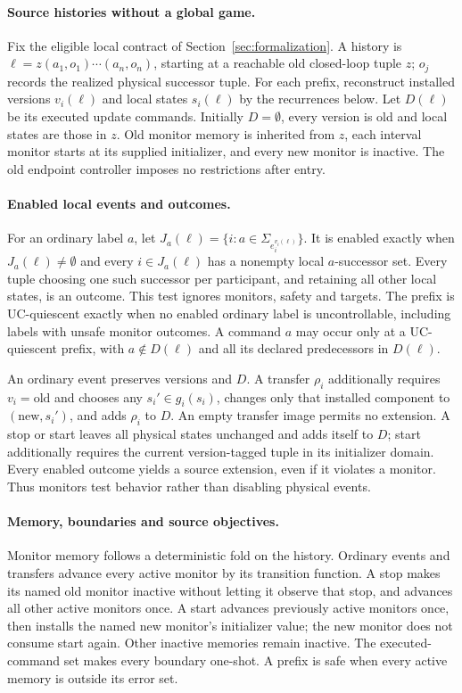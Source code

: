 \paragraph{Source histories without a global game.}
Fix the eligible local contract of Section~\ref{sec:formalization}. A history is
\(\ell=z(a_1,o_1)\cdots(a_n,o_n)\), starting at a reachable old closed-loop tuple $z$; $o_j$ records the realized physical successor tuple. For each prefix, reconstruct installed versions $v_i(\ell)$ and local states $s_i(\ell)$ by the recurrences below. Let $D(\ell)$ be its executed update commands. Initially $D=\emptyset$, every version is old and local states are those in $z$. Old monitor memory is inherited from $z$, each interval monitor starts at its supplied initializer, and every new monitor is inactive. The old endpoint controller imposes no restrictions after entry.

\paragraph{Enabled local events and outcomes.}
For an ordinary label $a$, let $J_a(\ell)=\{i:a\in\Sigma_{e_i^{v_i(\ell)}}\}$. It is enabled exactly when $J_a(\ell)\ne\emptyset$ and every $i\in J_a(\ell)$ has a nonempty local $a$-successor set. Every tuple choosing one such successor per participant, and retaining all other local states, is an outcome. This test ignores monitors, safety and targets. The prefix is UC-quiescent exactly when no enabled ordinary label is uncontrollable, including labels with unsafe monitor outcomes. A command $a$ may occur only at a UC-quiescent prefix, with $a\notin D(\ell)$ and all its declared predecessors in $D(\ell)$.

An ordinary event preserves versions and $D$. A transfer $\rho_i$ additionally requires $v_i=\mathrm{old}$ and chooses any $s_i'\in g_i(s_i)$, changes only that installed component to $(\mathrm{new},s_i')$, and adds $\rho_i$ to $D$. An empty transfer image permits no extension. A stop or start leaves all physical states unchanged and adds itself to $D$; start additionally requires the current version-tagged tuple in its initializer domain. Every enabled outcome yields a source extension, even if it violates a monitor. Thus monitors test behavior rather than disabling physical events.

\paragraph{Memory, boundaries and source objectives.}
Monitor memory follows a deterministic fold on the history. Ordinary events and transfers advance every active monitor by its transition function. A stop makes its named old monitor inactive without letting it observe that stop, and advances all other active monitors once. A start advances previously active monitors once, then installs the named new monitor's initializer value; the new monitor does not consume start again. Other inactive memories remain inactive. The executed-command set makes every boundary one-shot. A prefix is safe when every active memory is outside its error set.

